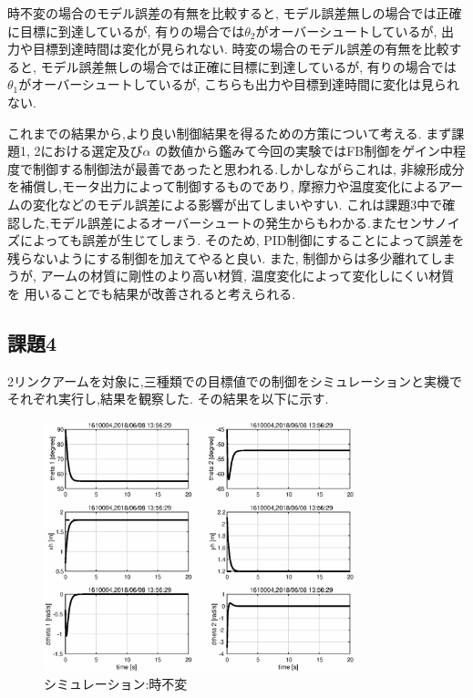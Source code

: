 \documentclass[a4paper,11pt,titlepage]{jsarticle}
\begin{document}
{時不変の場合のモデル誤差の有無を比較すると, モデル誤差無しの場合では正確に目標に到達しているが,
有りの場合では$\theta_2$がオーバーシュートしているが, 出力や目標到達時間は変化が見られない.
時変の場合のモデル誤差の有無を比較すると, モデル誤差無しの場合では正確に目標に到達しているが,
有りの場合では$\theta_1$がオーバーシュートしているが, こちらも出力や目標到達時間に変化は見られない.
\par
これまでの結果から,より良い制御結果を得るための方策について考える. まず課題1, 2における選定及び$\alpha$
の数値から鑑みて今回の実験ではFB制御をゲイン中程度で制御する制御法が最善であったと思われる.しかしながらこれは,
非線形成分を補償し,モータ出力によって制御するものであり, 摩擦力や温度変化によるアームの変化などのモデル誤差による影響が出てしまいやすい.
これは課題3中で確認した,モデル誤差によるオーバーシュートの発生からもわかる.またセンサノイズによっても誤差が生じてしまう.
そのため, PID制御にすることによって誤差を残らないようにする制御を加えてやると良い.
また, 制御からは多少離れてしまうが, アームの材質に剛性のより高い材質, 温度変化によって変化しにくい材質を
用いることでも結果が改善されると考えられる.

\subsection{課題4}
2リンクアームを対象に,三種類での目標値での制御をシミュレーションと実機でそれぞれ実行し,結果を観察した.
その結果を以下に示す.

\begin{figure}[H]
  \begin{center}
    \includegraphics[width = 9cm]{画像/eps_手先_時不変_時間応答}
    \caption{シミュレーション:時不変}
    \label{手先1}
  \end{center}
\end{figure}

}
\end{document}
